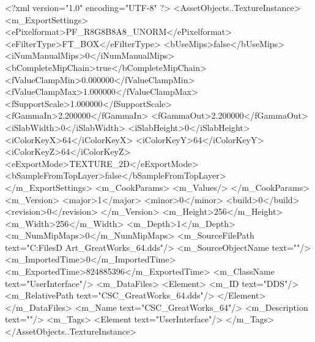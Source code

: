 <?xml version="1.0" encoding="UTF-8" ?>
<AssetObjects..TextureInstance>
	<m_ExportSettings>
		<ePixelformat>PF_R8G8B8A8_UNORM</ePixelformat>
		<eFilterType>FT_BOX</eFilterType>
		<bUseMips>false</bUseMips>
		<iNumManualMips>0</iNumManualMips>
		<bCompleteMipChain>true</bCompleteMipChain>
		<fValueClampMin>0.000000</fValueClampMin>
		<fValueClampMax>1.000000</fValueClampMax>
		<fSupportScale>1.000000</fSupportScale>
		<fGammaIn>2.200000</fGammaIn>
		<fGammaOut>2.200000</fGammaOut>
		<iSlabWidth>0</iSlabWidth>
		<iSlabHeight>0</iSlabHeight>
		<iColorKeyX>64</iColorKeyX>
		<iColorKeyY>64</iColorKeyY>
		<iColorKeyZ>64</iColorKeyZ>
		<eExportMode>TEXTURE_2D</eExportMode>
		<bSampleFromTopLayer>false</bSampleFromTopLayer>
	</m_ExportSettings>
	<m_CookParams>
		<m_Values/>
	</m_CookParams>
	<m_Version>
		<major>1</major>
		<minor>0</minor>
		<build>0</build>
		<revision>0</revision>
	</m_Version>
	<m_Height>256</m_Height>
	<m_Width>256</m_Width>
	<m_Depth>1</m_Depth>
	<m_NumMipMaps>0</m_NumMipMaps>
	<m_SourceFilePath text="C:\Users\Shadow\Desktop\Working Files\2D Art\GreatWorks\CSC_GreatWorks_64.dds"/>
	<m_SourceObjectName text=""/>
	<m_ImportedTime>0</m_ImportedTime>
	<m_ExportedTime>824885396</m_ExportedTime>
	<m_ClassName text="UserInterface"/>
	<m_DataFiles>
		<Element>
			<m_ID text="DDS"/>
			<m_RelativePath text="CSC_GreatWorks_64.dds"/>
		</Element>
	</m_DataFiles>
	<m_Name text="CSC_GreatWorks_64"/>
	<m_Description text=""/>
	<m_Tags>
		<Element text="UserInterface"/>
	</m_Tags>
</AssetObjects..TextureInstance>

